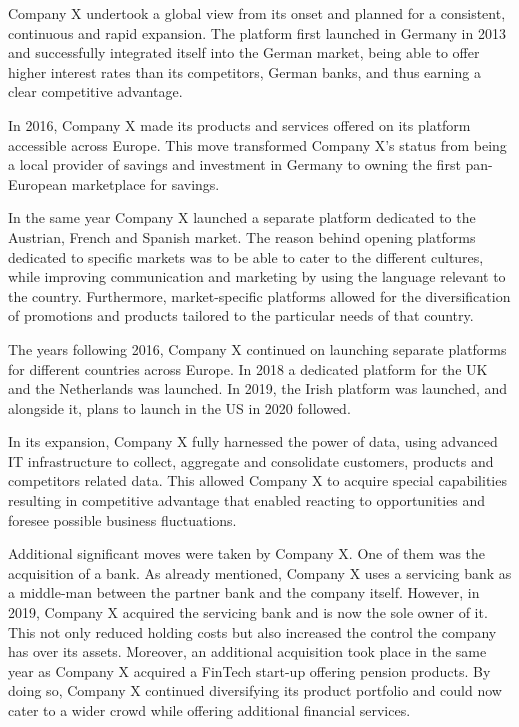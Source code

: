 \documentclass[11pt,a4paper]{article}
\begin{document}
{{Company X undertook a global view from its onset and planned for a consistent, continuous and rapid expansion. The platform first launched in Germany in 2013 and successfully integrated itself into the German market, being able to offer higher interest rates than its competitors, German banks, and thus earning a clear competitive advantage. \par
In 2016, Company X made its products and services offered on its platform accessible across Europe. This move transformed Company X's status from being a local provider of savings and investment in Germany to owning the first pan-European marketplace for savings. \par
In the same year Company X launched a separate platform dedicated to the Austrian, French and Spanish market. The reason behind opening platforms dedicated to specific markets was to be able to cater to the different cultures, while improving communication and marketing by using the language relevant to the country. Furthermore, market-specific platforms allowed for the diversification of promotions and products tailored to the particular needs of that country. \par 
The years following 2016, Company X continued on launching separate platforms for different countries across Europe. In 2018 a dedicated platform for the UK and the Netherlands was launched. In 2019, the Irish platform was launched, and alongside it, plans to launch in the US in 2020 followed. \par
In its expansion, Company X fully harnessed the power of data, using advanced IT infrastructure to collect, aggregate and consolidate customers, products and competitors related data. This allowed Company X to acquire special capabilities resulting in competitive advantage \parencite{porterStrategyInternet2001} that enabled reacting to opportunities and foresee possible business fluctuations.  \par
Additional significant moves were taken by Company X. One of them was the acquisition of a bank. As already mentioned, Company X uses a servicing bank as a middle-man between the partner bank and the company itself. However, in 2019, Company X acquired the servicing bank and is now the sole owner of it. This not only reduced holding costs but also increased the control the company has over its assets. Moreover, an additional acquisition took place in the same year as Company X acquired a FinTech start-up offering pension products. By doing so, Company X continued diversifying its product portfolio and could now cater to a wider crowd while offering additional financial services. \par

}}
\end{document}
